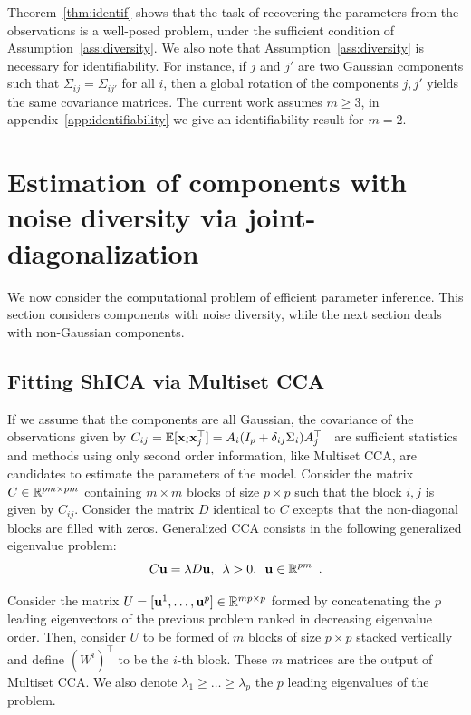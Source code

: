 \documentclass[12pt]{report}
\begin{document}
Theorem~\ref{thm:identif} shows that the task of recovering the parameters from the observations is a well-posed problem, under the sufficient condition of Assumption~\ref{ass:diversity}.  We also note that Assumption~\ref{ass:diversity} is necessary for identifiability. For instance, if $j$ and $j'$ are two Gaussian components such that $\Sigma_{ij} = \Sigma_{ij'}$ for all $i$, then a global rotation of the components $j, j'$ yields the same covariance matrices. The current work assumes $m \geq 3$, in appendix~\ref{app:identifiability} we give an identifiability result for $m=2$.



\section{Estimation of components with noise diversity via joint-diagonalization}

We now consider the computational problem of efficient parameter inference. This section considers components with noise diversity, while the next section deals with non-Gaussian components.


\subsection{Fitting ShICA via Multiset CCA}
If we assume that the components are all Gaussian, %
the covariance of the observations given by
$C_{ij}=  \mathbb{E}[\mathbf{x}_i\mathbf{x}_j^\top] = A_i(I_p + \delta_{ij}\Sigma_i)A_j^{\top}\enspace
$ are sufficient statistics and methods using only second order information, like Multiset CCA, are candidates to estimate the parameters of the model.
Consider the
matrix $C \in \mathbb{R}^{pm \times pm}$ containing $m \times m$ blocks of size $p
\times p$
such that the block $i,j$ is given by $C_{ij}$. Consider the matrix $D$ identical to $C$ excepts that the non-diagonal blocks are filled with zeros. 
Generalized CCA consists in the following generalized eigenvalue problem:
\begin{equation}
\label{eq:eigv}
    C \mathbf{u} = \lambda D\mathbf{u},\enspace \lambda > 0,\enspace \mathbf{u}\in\mathbb{R}^{pm} \enspace .
\end{equation}
  
Consider the matrix $U = [\mathbf{u}^1, \dots, \mathbf{u}^p] \in \mathbb{R}^{mp \times p}$ formed by concatenating the $p$ leading eigenvectors of the previous problem ranked in decreasing eigenvalue order. Then, consider $U$ to be formed of $m$ blocks of size $p \times p$ stacked vertically and define $(W^i)^{\top}$ to be the $i$-th block. These $m$ matrices are the output of Multiset CCA. We also denote $\lambda_1 \geq \dots \geq \lambda_p$ the $p$ leading eigenvalues of the problem.
\end{document}
